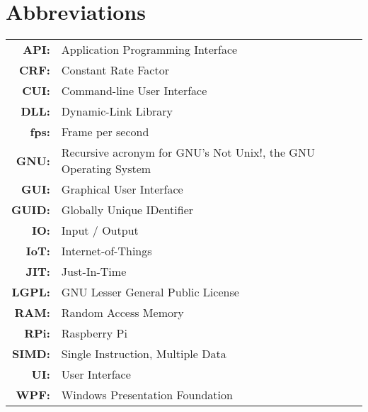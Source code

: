 \renewcommand{\baselinestretch}{1}
\chapter{Abbreviations}

\begin{tabular}{rl}
  \vspace{0.1em} \textbf{API:} & Application Programming Interface \\
  \vspace{0.1em} \textbf{CRF:} & Constant Rate Factor \\
  \vspace{0.1em} \textbf{CUI:} & Command-line User Interface \\
  \vspace{0.1em} \textbf{DLL:} & Dynamic-Link Library \\
  \vspace{0.1em} \textbf{fps:} & Frame per second \\
  \vspace{0.1em} \textbf{GNU:} & Recursive acronym for \ca{``}GNU's Not Unix!\ca{''}, the GNU Operating System \\
  \vspace{0.1em} \textbf{GUI:} & Graphical User Interface \\
  \vspace{0.1em} \textbf{GUID:} & Globally Unique IDentifier \\
  \vspace{0.1em} \textbf{IO:} & Input / Output \\
  \vspace{0.1em} \textbf{IoT:} & Internet-of-Things \\
  \vspace{0.1em} \textbf{JIT:} & Just-In-Time \\
  \vspace{0.1em} \textbf{LGPL:} & GNU Lesser General Public License \\
  \vspace{0.1em} \textbf{RAM:} & Random Access Memory \\
  \vspace{0.1em} \textbf{RPi:} & Raspberry Pi \\
  \vspace{0.1em} \textbf{SIMD:} & Single Instruction, Multiple Data \\
  \vspace{0.1em} \textbf{UI:} & User Interface \\
  \vspace{0.1em} \textbf{WPF:} & Windows Presentation Foundation \\
\end{tabular}

